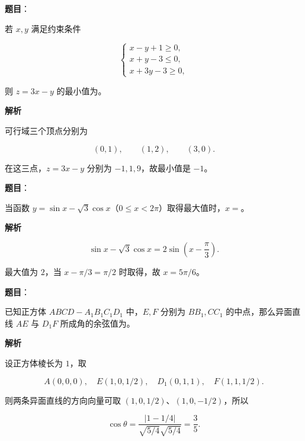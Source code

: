 \begin{answer}

\textbf{题目}：

若 $x,y$ 满足约束条件

\nopagebreak[4]
\[
\begin{cases}
x-y+1\geq0,\\
x+y-3\leq0,\\
x+3y-3\geq0,
\end{cases}
\]

则 $z=3x-y$ 的最小值为\underline{\hspace{2cm}}。

\textbf{解析}

可行域三个顶点分别为

\nopagebreak[4]
\[
(0,1),\qquad(1,2),\qquad(3,0).
\]

在这三点，$z=3x-y$ 分别为 $-1,1,9$，故最小值是 $-1$。


\end{answer}
\begin{answer}

\textbf{题目}：

当函数 $y=\sin x-\sqrt3\cos x$（$0\leq x<2\pi$）取得最大值时，$x=$\underline{\hspace{2cm}}。

\textbf{解析}

\nopagebreak[4]
\[
\sin x-\sqrt3\cos x=2\sin\left(x-\frac\pi3\right).
\]

最大值为 $2$，当 $x-\pi/3=\pi/2$ 时取得，故 $x=5\pi/6$。


\end{answer}
\begin{answer}

\textbf{题目}：

已知正方体 $ABCD-A_1B_1C_1D_1$ 中，$E,F$ 分别为 $BB_1,CC_1$ 的中点，那么异面直线 $AE$ 与 $D_1F$ 所成角的余弦值为\underline{\hspace{2cm}}。

\textbf{解析}

设正方体棱长为 $1$，取

\nopagebreak[4]
\[
A(0,0,0),\quad E(1,0,1/2),\quad D_1(0,1,1),\quad F(1,1,1/2).
\]

则两条异面直线的方向向量可取 $(1,0,1/2)$、$(1,0,-1/2)$，所以

\nopagebreak[4]
\[
\cos\theta=\frac{|1-1/4|}{\sqrt{5/4}\sqrt{5/4}}=\frac35.
\]


\end{answer}

